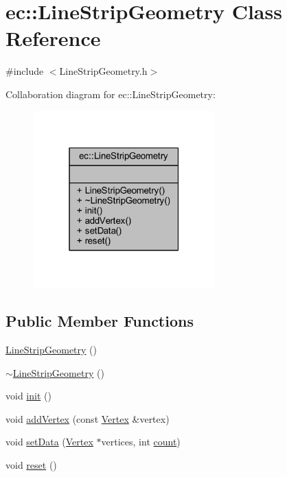 \hypertarget{classec_1_1_line_strip_geometry}{}\section{ec\+:\+:Line\+Strip\+Geometry Class Reference}
\label{classec_1_1_line_strip_geometry}


{\ttfamily \#include $<$Line\+Strip\+Geometry.\+h$>$}



Collaboration diagram for ec\+:\+:Line\+Strip\+Geometry\+:\nopagebreak
\begin{figure}[H]
\begin{center}
\leavevmode
\includegraphics[width=199pt]{classec_1_1_line_strip_geometry__coll__graph}
\end{center}
\end{figure}
\subsection*{Public Member Functions}
\begin{DoxyCompactItemize}
\item 
\mbox{\hyperlink{classec_1_1_line_strip_geometry_ad93597cb912f407b6e7be3f3d377cc4d}{Line\+Strip\+Geometry}} ()
\item 
\mbox{\hyperlink{classec_1_1_line_strip_geometry_a2fcbc3ebbd2318f00da14dbf7a2c87f3}{$\sim$\+Line\+Strip\+Geometry}} ()
\item 
void \mbox{\hyperlink{classec_1_1_line_strip_geometry_a8dac12c33ec187961ba4ac1573d718a5}{init}} ()
\item 
void \mbox{\hyperlink{classec_1_1_line_strip_geometry_a8c4384fdfb6f66b18428a1ae8e09b1fc}{add\+Vertex}} (const \mbox{\hyperlink{structec_1_1_vertex}{Vertex}} \&vertex)
\item 
void \mbox{\hyperlink{classec_1_1_line_strip_geometry_ae55bfbf2b8dc1055edc22329601483e0}{set\+Data}} (\mbox{\hyperlink{structec_1_1_vertex}{Vertex}} $\ast$vertices, int \mbox{\hyperlink{namespaceec_a4dc8d59c4e90842e057344aefde0efbd}{count}})
\item 
void \mbox{\hyperlink{classec_1_1_line_strip_geometry_abaf125f40af2b979e4b3af3939bb0a0e}{reset}} ()
\end{DoxyCompactItemize}



